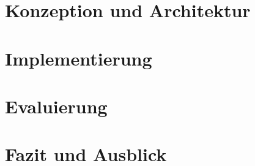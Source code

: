 \documentclass[a4paper,12pt]{scrreprt}
\begin{document}
\chapter{Konzeption und Architektur}

\chapter{Implementierung}

\chapter{Evaluierung}

\chapter{Fazit und Ausblick}

\printbibliography
\end{document}
